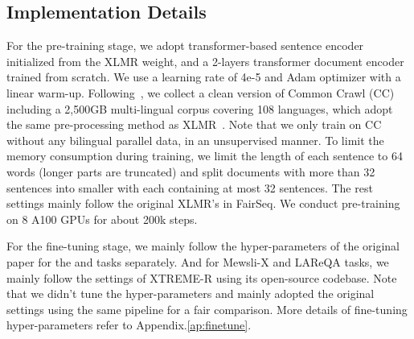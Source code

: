 



\subsection{Implementation Details}

For the pre-training stage, we adopt transformer-based sentence encoder initialized from the XLMR weight, and a 2-layers transformer document encoder trained from scratch. We use a learning rate of 4e-5 and Adam optimizer with a linear warm-up. Following~\citet{wenzek2019ccnet}, we collect a clean version of Common Crawl (CC) including a 2,500GB multi-lingual corpus covering 108 languages, which 
adopt the same pre-processing method as XLMR~\citep{conneau2019unsupervised}. Note that we only train on CC without any bilingual parallel data, in an unsupervised manner. To limit the memory consumption during training, we limit the length of each sentence to 64 words (longer parts are truncated) and split documents with more than 32 sentences into smaller with each containing at most 32 sentences. The rest settings mainly follow the original XLMR's in FairSeq. We conduct pre-training on 8 A100 GPUs for about 200k steps. 

For the fine-tuning stage, we mainly follow the hyper-parameters of the original paper for the \tydi and \xor tasks separately. And for Mewsli-X and LAReQA tasks, we mainly follow the settings of XTREME-R using its open-source codebase. Note that we didn't tune the hyper-parameters and mainly adopted the original settings using the same pipeline for a fair comparison. More details of fine-tuning hyper-parameters refer to Appendix.\ref{ap:finetune}.


